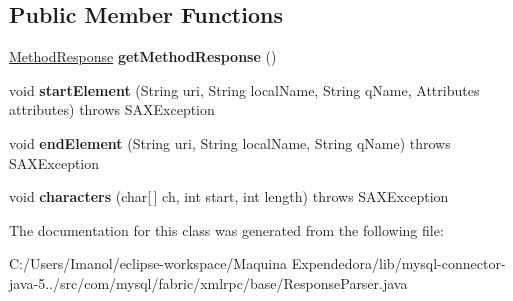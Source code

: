\subsection*{Public Member Functions}
\begin{DoxyCompactItemize}
\item 
\mbox{\label{classcom_1_1mysql_1_1fabric_1_1xmlrpc_1_1base_1_1_response_parser_a1ba7b8b476069338300348463d43db59}} 
\mbox{\hyperlink{classcom_1_1mysql_1_1fabric_1_1xmlrpc_1_1base_1_1_method_response}{Method\+Response}} {\bfseries get\+Method\+Response} ()
\item 
\mbox{\label{classcom_1_1mysql_1_1fabric_1_1xmlrpc_1_1base_1_1_response_parser_a1784d7145f5c7cf76131575396c47a29}} 
void {\bfseries start\+Element} (String uri, String local\+Name, String q\+Name, Attributes attributes)  throws S\+A\+X\+Exception 
\item 
\mbox{\label{classcom_1_1mysql_1_1fabric_1_1xmlrpc_1_1base_1_1_response_parser_ae7785d15a01c14f17481b9415656d63f}} 
void {\bfseries end\+Element} (String uri, String local\+Name, String q\+Name)  throws S\+A\+X\+Exception 
\item 
\mbox{\label{classcom_1_1mysql_1_1fabric_1_1xmlrpc_1_1base_1_1_response_parser_abedaaccd02dc6b82fb5f1d6fde983dca}} 
void {\bfseries characters} (char\mbox{[}$\,$\mbox{]} ch, int start, int length)  throws S\+A\+X\+Exception 
\end{DoxyCompactItemize}


The documentation for this class was generated from the following file\+:\begin{DoxyCompactItemize}
\item 
C\+:/\+Users/\+Imanol/eclipse-\/workspace/\+Maquina Expendedora/lib/mysql-\/connector-\/java-\/5../src/com/mysql/fabric/xmlrpc/base/Response\+Parser.\+java\end{DoxyCompactItemize}
